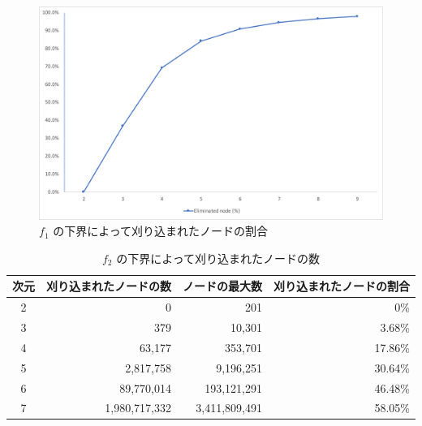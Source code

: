 \documentclass[a4paper,11pt]{jreport}
\begin{document}
\begin{figure}[h]
\begin{center}
\includegraphics[width=13.5cm]{graphs/f_1_eliminated.pdf}
\caption{$ f_1 $ の下界によって刈り込まれたノードの割合}
\label{fig:f_1_eliminated}
\end{center}
\end{figure}

\newpage

\begin{table}[h]
\caption{$ f_2 $ の下界によって刈り込まれたノードの数}
\label{tbl:f_2_eliminated}
\begin{center}
\begin{tabular}{|c|r|r|r|} \hline
次元 & 刈り込まれたノードの数 & ノードの最大数 & 刈り込まれたノードの割合 \\ \hline
2 & 0 & 201 & 0\% \\
3 & 379 & 10,301 & 3.68\% \\
4 & 63,177 & 353,701 & 17.86\% \\
5 & 2,817,758 & 9,196,251 & 30.64\% \\
6 & 89,770,014 & 193,121,291 & 46.48\% \\ 
7 & 1,980,717,332 & 3,411,809,491 & 58.05\% \\ \hline
\end{tabular}
\end{center}
\end{table}
\end{document}
